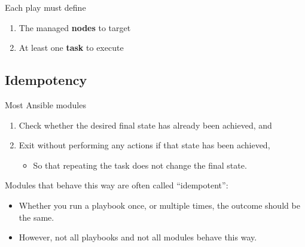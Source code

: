 \documentclass[slides]{pgnotes}
\begin{document}
\begin{bluebox}{Each play must define}
  \begin{enumerate}
  \item The managed \textbf{nodes} to target
  \item At least one \textbf{task} to execute
  \end{enumerate}
\end{bluebox}


\subsection{Idempotency}

Most Ansible modules
\begin{enumerate}
\item Check whether the desired final state has already been achieved, and
\item Exit without performing any actions if that state has been achieved,
  \begin{itemize}
    \item So that repeating the task does not change the final state.
  \end{itemize}
\end{enumerate}

Modules that behave this way are often called ``idempotent'':
\begin{itemize}
\item Whether you run a playbook once, or multiple times, the outcome should be the same.
\item However, not all playbooks and not all modules behave this way.
\end{itemize}
\end{document}
